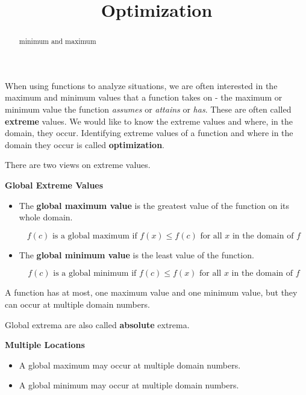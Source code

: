 \documentclass{ximera}
\title{Optimization}
\begin{document}
\begin{abstract}
minimum and maximum
\end{abstract}
\maketitle



When using functions to analyze situations, we are often interested in the maximum and minimum values that a function takes on - the maximum or minimum value the function \textit{assumes} or \textit{attains} or \textit{has}. These are often called \textbf{extreme} values. We would like to know the extreme values and where, in the domain, they occur.  Identifying extreme values of a function and where in the domain they occur is called \textbf{optimization}.



There are two views on extreme values.

\begin{definition} \textbf{\textcolor{green!50!black}{Global Extreme Values}} 

\begin{itemize}
\item The \textbf{global maximum value} is the greatest value of the function on its whole domain.  

\[  f(c) \text{ is a global maximum if } f(x) \leq f(c) \text{ for all } x \text{ in the domain of } f \]

\item The \textbf{global minimum value} is the least value of the function.  

\[  f(c) \text{ is a global minimum if } f(c) \leq f(x) \text{ for all } x \text{ in the domain of } f \]
\end{itemize}

A function has at most, one maximum value and one minimum value, but they can occur at multiple domain numbers.

Global extrema are also called \textbf{absolute} extrema.

\end{definition}




\begin{warning} \textbf{\textcolor{red!70!black}{Multiple Locations}}

\begin{itemize}
\item A global maximum may occur at multiple domain numbers.  
\item A global minimum may occur at multiple domain numbers. 
\end{itemize}

\end{warning}
\end{document}
